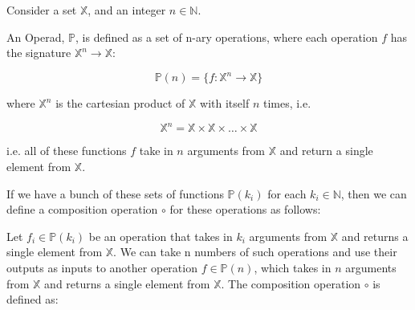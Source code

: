 Consider a set $\mathbb{X}$, and an integer $n \in \mathbb{N}$.

An Operad, $\mathbb{P}$, is defined as a set of n-ary operations, where each operation $f$ has the signature $\mathbb{X}^n \to \mathbb{X}$:

\begin{equation}
  \mathbb{P}(n) = \{f: \mathbb{X}^n \to \mathbb{X}\}
\end{equation}

where $\mathbb{X}^n$ is the cartesian product of $\mathbb{X}$ with itself $n$ times, i.e.

\begin{equation}
  \mathbb{X}^n = \mathbb{X} \times \mathbb{X} \times \ldots \times \mathbb{X}
\end{equation}

i.e. all of these functions $f$ take in $n$ arguments from $\mathbb{X}$ and return a single element from $\mathbb{X}$.

\begin{figure}[h]
\centering
\end{figure}

If we have a bunch of these sets of functions $\mathbb{P}(k_i)$ for each $k_i \in \mathbb{N}$, then we can define a composition operation $\circ$ for these operations as follows:

Let $f_i \in \mathbb{P}(k_i)$ be an operation that takes in $k_i$ arguments from $\mathbb{X}$ and returns a single element from $\mathbb{X}$. We can take n numbers of such operations and use their outputs as inputs to another operation $f \in \mathbb{P}(n)$, which takes in $n$ arguments from $\mathbb{X}$ and returns a single element from $\mathbb{X}$. The composition operation $\circ$ is defined as:

